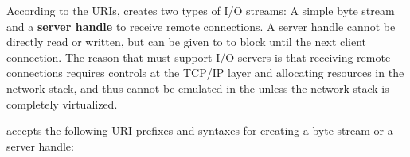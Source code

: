 According to the URIs, 
creates two types of I/O streams:
A simple byte stream and
a {\bf server handle} to receive remote connections.
A server handle cannot be directly read or written,
but can be given to  to block until the next client connection.
The reason that \thehostabi{} must support
I/O servers
is that receiving remote connections
requires controls
at the TCP/IP layer and allocating resources
in the network stack,
and thus cannot be emulated in the \libos{}
unless the network stack is completely virtualized.




 accepts the following URI prefixes and syntaxes for creating a byte stream or a server handle:


